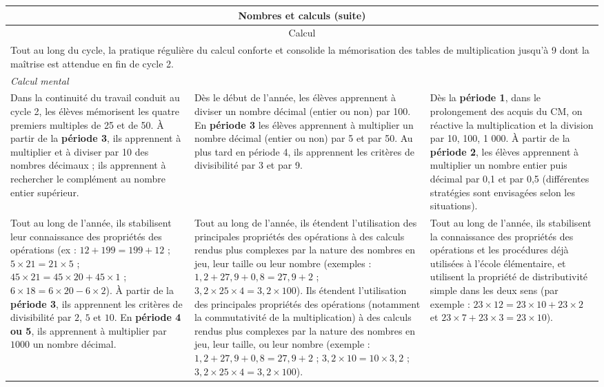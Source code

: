 \documentclass[11pt]{article}
\newcommand{\categorie}[1]{\hline\multicolumn{3}{|c|}{\color{white}\Large\cellcolor{or}\sffamily\phantom{É} #1 \phantom{É}}\rmfamily \\\hline}
\newcommand{\souscategorie}[1]{\hline\multicolumn{3}{|c|}{\color{or}\sffamily\phantom{É}#1\phantom{É}\rmfamily}\\\hline}
\newcommand{\note}[1]{\hline\multicolumn{3}{|p{18.6cm}|}{#1} \\ \hline}
\newenvironment{programme}
{
    \setlength{\arrayrulewidth}{0.5pt}
    \arrayrulecolor{or}
    \begin{center}
    \begin{tabular}{|p{6.4cm}|p{6.4cm}|p{6.4cm}|}
}
{
    \hline
    \end{tabular}
    \end{center}
}
\begin{document}
\begin{programme}
    \categorie{Nombres et calculs (suite)} 
    \souscategorie{Calcul} 
    \note{Tout au long du cycle, la pratique régulière du calcul conforte et consolide la mémorisation des tables de multiplication jusqu’à 9 dont la maîtrise est attendue en fin de cycle 2.} 
    \note{\textit{Calcul mental}} 
    Dans la continuité du travail conduit au cycle 2, les élèves mémorisent les quatre premiers multiples de 25 et de 50. À partir de la \textbf{période 3}, ils apprennent à multiplier et à diviser par 10 des nombres décimaux ; ils apprennent à rechercher le complément au nombre entier supérieur. & Dès le début de l’année, les élèves apprennent à diviser un nombre décimal (entier ou non) par 100. En \textbf{période 3} les élèves apprennent à multiplier un nombre décimal (entier ou non) par 5 et par 50. Au plus tard en période 4, ils apprennent les critères de divisibilité par 3 et par 9. & Dès la \textbf{période 1}, dans le prolongement des acquis du CM, on réactive la multiplication et la division par 10, 100, 1 000. À partir de la \textbf{période 2}, les élèves apprennent à multiplier un nombre entier puis décimal par 0,1 et par 0,5 (différentes stratégies sont envisagées selon les situations). \\
    Tout au long de l’année, ils stabilisent leur connaissance des propriétés des opérations (ex : $12 + 199 = 199 + 12$ ; $5 \times 21 = 21 \times 5$ ; $45 \times 21 = 45 \times 20 + 45 \times 1$ ; $6 \times 18 = 6 \times 20 - 6 \times 2$). À partir de la \textbf{période 3}, ils apprennent les critères de divisibilité par $2$, $5$ et $10$. En \textbf{période 4 ou 5}, ils apprennent à multiplier par $1 000$ un nombre décimal. & Tout au long de l’année, ils étendent l’utilisation des principales propriétés des opérations à des calculs rendus plus complexes par la nature des nombres en jeu, leur taille ou leur nombre (exemples : $1,2 + 27,9 + 0,8 = 27,9 + 2$ ; $3,2 \times 25 \times 4 = 3,2 \times 100$). Ils étendent l’utilisation des principales propriétés des opérations (notamment la commutativité de la multiplication) à des calculs rendus plus complexes par la nature des nombres en jeu, leur taille, ou leur nombre (exemple : $1,2 + 27,9 + 0,8 = 27,9 + 2$ ; $3,2 \times 10 = 10 \times 3,2$ ; $3,2 \times 25 \times 4 = 3,2 \times 100$). & Tout au long de l’année, ils stabilisent la connaissance des propriétés des opérations et les procédures déjà utilisées à l’école élémentaire, et utilisent la propriété de distributivité simple dans les deux sens (par exemple : $23 \times 12 = 23 \times 10 + 23 \times 2$ et $23 \times 7 + 23 \times 3 = 23 \times 10$). \\ 

\end{programme}
\end{document}
